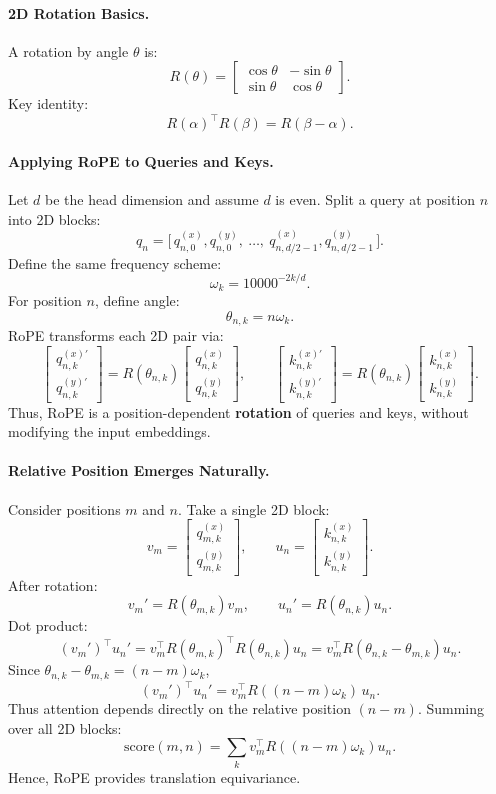 \documentclass[11pt]{article}
\theoremstyle{remark}
\begin{document}
\paragraph{2D Rotation Basics.}
A rotation by angle $\theta$ is:
\[
R(\theta) =
\begin{bmatrix}
\cos\theta & -\sin\theta \\[2pt]
\sin\theta & \cos\theta
\end{bmatrix}.
\]
Key identity:
\[
R(\alpha)^\top R(\beta) = R(\beta - \alpha).
\]

\paragraph{Applying RoPE to Queries and Keys.}
Let $d$ be the head dimension and assume $d$ is even.
Split a query at position $n$ into 2D blocks:
\[
q_n = \big[\, q_{n,0}^{(x)}, q_{n,0}^{(y)}, ~ \dots, ~ q_{n,d/2-1}^{(x)}, q_{n,d/2-1}^{(y)} \,\big].
\]
Define the same frequency scheme:
\[
\omega_k = 10000^{-2k/d}.
\]
For position $n$, define angle:
\[
\theta_{n,k} = n \omega_k.
\]
RoPE transforms each 2D pair via:
\[
\begin{bmatrix}
q_{n,k}^{(x)\prime} \\
q_{n,k}^{(y)\prime}
\end{bmatrix}
=
R(\theta_{n,k})
\begin{bmatrix}
q_{n,k}^{(x)} \\
q_{n,k}^{(y)}
\end{bmatrix},
\qquad
\begin{bmatrix}
k_{n,k}^{(x)\prime} \\
k_{n,k}^{(y)\prime}
\end{bmatrix}
=
R(\theta_{n,k})
\begin{bmatrix}
k_{n,k}^{(x)} \\
k_{n,k}^{(y)}
\end{bmatrix}.
\]
Thus, RoPE is a position-dependent \textbf{rotation} of queries and keys, without modifying the input embeddings.

\paragraph{Relative Position Emerges Naturally.}
Consider positions $m$ and $n$.
Take a single 2D block:
\[
v_m =
\begin{bmatrix} q_{m,k}^{(x)} \\ q_{m,k}^{(y)} \end{bmatrix},\qquad
u_n =
\begin{bmatrix} k_{n,k}^{(x)} \\ k_{n,k}^{(y)} \end{bmatrix}.
\]
After rotation:
\[
v_m' = R(\theta_{m,k}) v_m,\qquad
u_n' = R(\theta_{n,k}) u_n.
\]
Dot product:
\[
(v_m')^\top u_n'
= v_m^\top R(\theta_{m,k})^\top R(\theta_{n,k}) u_n
= v_m^\top R(\theta_{n,k}-\theta_{m,k}) u_n.
\]
Since $\theta_{n,k}-\theta_{m,k} = (n-m)\omega_k$,
\[
(v_m')^\top u_n'
= v_m^\top R((n-m)\omega_k)\, u_n.
\]
Thus attention depends directly on the relative position $(n-m)$.
Summing over all 2D blocks:
\[
\text{score}(m,n) = \sum_{k} v_m^\top R((n-m)\omega_k) u_n.
\]
Hence, RoPE provides translation equivariance.
\end{document}
